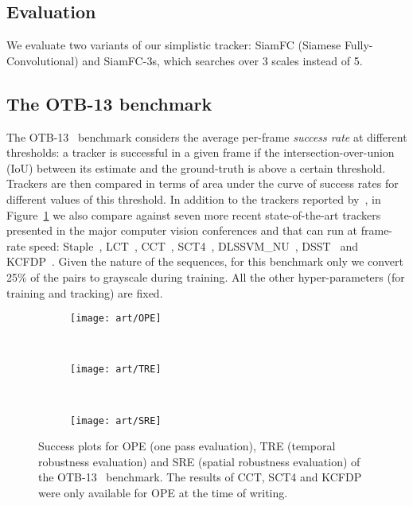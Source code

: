 \documentclass[runningheads]{llncs}
\begin{document}
\subsection{Evaluation}
We evaluate two variants of our simplistic tracker: SiamFC (Siamese Fully-Convolutional) and SiamFC-3s, which searches over 3 scales instead of 5.



\subsection{The OTB-13 benchmark}
The OTB-13~\cite{WuLimYang13} benchmark considers the average per-frame \textit{success rate} at different thresholds: a tracker is successful in a given frame if the intersection-over-union (IoU) between its estimate and the ground-truth is above a certain threshold.
Trackers are then compared in terms of area under the curve of success rates for different values of this threshold.
In addition to the trackers reported by~\cite{WuLimYang13}, in Figure~\ref{fig:OTB} we also compare against seven more recent state-of-the-art trackers presented in the major computer vision conferences and that can run at frame-rate speed: Staple~\cite{bertinetto2015staple}, LCT~\cite{ma2015long}, CCT~\cite{zhu2015collaborative}, SCT4~\cite{choi2016visual}, DLSSVM\_NU~\cite{Ning_2016_CVPR}, DSST~\cite{danelljan2014accurate} and KCFDP~\cite{huang12enable}.
Given the nature of the sequences, for this benchmark only we convert 25\% of the pairs to grayscale during training.
All the other hyper-parameters (for training and tracking) are fixed.



\begin{figure}[t!]
    \centering
    \begin{subfigure}[t]{0.32\textwidth}
        \centering
        \texttt{[image: art/OPE]}
    \end{subfigure}~
    \begin{subfigure}[t]{0.32\textwidth}
        \centering
        \texttt{[image: art/TRE]}
    \end{subfigure}
    ~
    \begin{subfigure}[t]{0.32\textwidth}
        \centering
        \texttt{[image: art/SRE]}
    \end{subfigure}
    \caption{Success plots for OPE (one pass evaluation), TRE (temporal robustness evaluation) and SRE (spatial robustness evaluation) of the OTB-13~\cite{WuLimYang13} benchmark. The results of CCT, SCT4 and KCFDP were only available for OPE at the time of writing.}
    \label{fig:OTB}
\end{figure}
\end{document}
